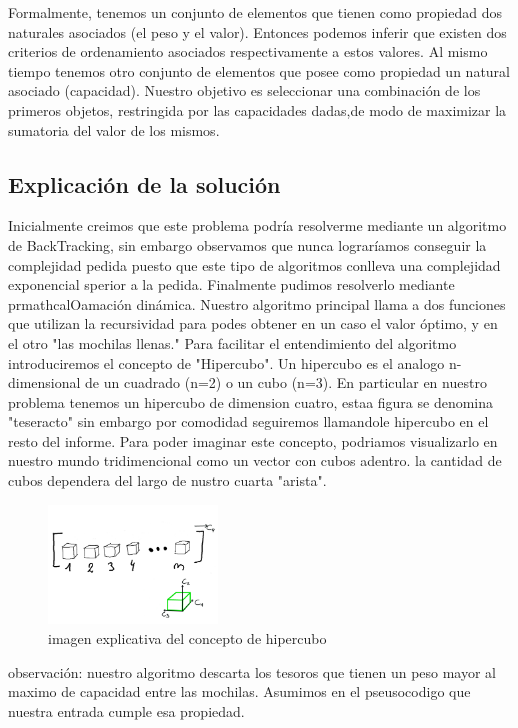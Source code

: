 \documentclass[spanish,12pt]{article}
\begin{document}
Formalmente, tenemos un conjunto de elementos que tienen como propiedad dos naturales asociados (el peso y el valor). Entonces podemos inferir que existen dos criterios de ordenamiento asociados respectivamente a estos valores.
Al mismo tiempo tenemos otro conjunto de elementos que posee como propiedad un natural asociado (capacidad).
Nuestro objetivo es seleccionar una combinación de los primeros objetos, restringida por las capacidades dadas,de modo de maximizar la sumatoria del valor de los mismos.


\subsection{Explicación de la solución}

   Inicialmente creimos que este problema podría resolverme mediante un algoritmo de BackTracking, sin embargo observamos que nunca lograríamos conseguir la complejidad pedida puesto que este tipo de algoritmos conlleva una complejidad exponencial sperior a la pedida.
   Finalmente pudimos resolverlo mediante prmathcal{O}amación dinámica. Nuestro algoritmo principal llama a dos funciones que utilizan la recursividad para podes obtener en un caso el valor óptimo, y en el otro "las mochilas llenas."
   Para facilitar el entendimiento del algoritmo introduciremos el concepto de "Hipercubo". Un hipercubo es el analogo n-dimensional de un cuadrado (n=2) o un cubo (n=3). En particular en nuestro problema tenemos un hipercubo de dimension cuatro, estaa figura se denomina "teseracto" sin embargo por comodidad seguiremos llamandole hipercubo en el resto del informe.
Para poder imaginar este concepto, podriamos visualizarlo en nuestro mundo tridimencional como un vector con cubos adentro. la cantidad de cubos dependera del largo de nustro cuarta "arista".

\begin{figure}[H]
\centering
\includegraphics[width=0.4\textwidth]{hipercubo}
\caption{imagen explicativa del concepto de hipercubo}
\end{figure}


observación: nuestro algoritmo descarta los tesoros que tienen un peso mayor al maximo de capacidad entre las mochilas. Asumimos en el pseusocodigo que nuestra entrada cumple esa propiedad.
\end{document}
